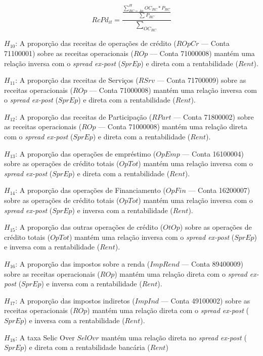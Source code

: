 \documentclass[
  12pt,
  12pt,
  openright,
  oneside,
  a4paper,
  chapter=TITLE,
  section=TITLE,
  subsection=TITLE,
  subsubsection=TITLE,
  english,
  portugues,
  sumario=tradicional]{abntex2}
\begin{document}
\begin{equation}
RcPd_{it} = \frac{\frac{\sum_{RC = Aa}^HOC_{RC}*P_{RC}}{\sum_{}P_{RC}}}{\sum_{OC_{RC}}}
\end{equation}

\(H_{10}\): A proporção das receitas de operações de crédito (\(ROpCr\) --- Conta 71100001) sobre as receitas operacionais (\(ROp\) --- Conta 71000008) mantém uma relação inversa com o \emph{spread ex-post} (\(SprEp\)) e direta com a rentabilidade (\(Rent\)).

\(H_{11}\): A proporção das receitas de Serviços (\(RSrv\) --- Conta 71700009) sobre as receitas operacionais (\(ROp\) --- Conta 71000008) mantém uma relação inversa com o \emph{spread ex-post} (\(SprEp\)) e direta com a rentabilidade (\(Rent\)).

\(H_{12}\): A proporção das receitas de Participação (\(RPart\) --- Conta 71800002) sobre as receitas operacionais (\(ROp\) --- Conta 71000008) mantém uma relação direta com o \emph{spread ex-post} (\(SprEp\)) e direta com a rentabilidade (\(Rent\)).

\(H_{13}\): A proporção das operações de empréstimo (\(OpEmp\) --- Conta 16100004) sobre as operações de crédito totais (\(OpTot\)) mantém uma relação inversa com o \emph{spread ex-post} (\(SprEp\)) e direta com a rentabilidade (\(Rent\)).

\(H_{14}\): A proporção das operações de Financiamento (\(OpFin\) --- Conta 16200007) sobre as operações de crédito totais (\(OpTot\)) mantém uma relação inversa com o \emph{spread ex-post} (\(SprEp\)) e inversa com a rentabilidade (\(Rent\)).

\(H_{15}\): A proporção das outras operações de crédito (\(OtOp\)) sobre as operações de crédito totais (\(OpTot\)) mantém uma relação inversa com o \emph{spread ex-post} (\(SprEp\)) e inversa com a rentabilidade (\(Rent\)).

\(H_{16}\): A proporção das impostos sobre a renda (\(ImpRend\) --- Conta 89400009) sobre as receitas operacionais (\(ROp\)) mantém uma relação direta com o \emph{spread ex-post} (\(SprEp\)) e inversa com a rentabilidade (\(Rent\)).

\(H_{17}\): A proporção das impostos indiretos (\(ImpInd\) --- Conta 49100002) sobre as receitas operacionais (\(ROp\)) mantém uma relação direta com o \emph{spread ex-post} (\(SprEp\)) e inversa com a rentabilidade (\(Rent\)).

\(H_{18}\): A taxa Selic Over \(SelOvr\) mantém uma relação direta no \emph{spread ex-post} (\(SprEp\)) e direta com a rentabilidade bancária (\(Rent\))
\end{document}
